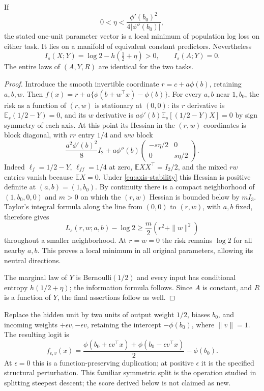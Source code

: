 \begin{proposition}
\label{prop:axis-local-min}
If
\begin{equation}
 0<\eta<\frac{\phi'(b_0)^2}{4|\phi''(b_0)|},
 \label{eq:axis-stability}
\end{equation}
the stated one-unit parameter vector is a local minimum of population
log loss on either task. It lies on a manifold of equivalent constant
predictors. Nevertheless
\[
 I_s(X;Y)=\log2-h(\tfrac12+\eta)>0,
 \qquad I_s(A;Y)=0.
\]
The entire laws of $(A,Y,R)$ are identical for the two tasks.
\end{proposition}
\begin{proof}
Introduce the smooth invertible coordinate $r=c+a\phi(b)$, retaining
$a,b,w$. Then
$f(x)=r+a\{\phi(b+w^\top x)-\phi(b)\}$.
For every $a,b$ near $1,b_0$, the risk as a function of $(r,w)$ is
stationary at $(0,0)$: its $r$ derivative is
$\mathbb E_s(1/2-Y)=0$, and its $w$ derivative is
$a\phi'(b)\mathbb E_s[(1/2-Y)X]=0$ by sign symmetry of each axis.
At this point its Hessian in the $(r,w)$ coordinates is block diagonal,
with $rr$ entry $1/4$ and $ww$ block
\begin{equation}
 \frac{a^2\phi'(b)^2}{8}I_2
 +a\phi''(b)
 \begin{pmatrix}-s\eta/2&0\\0&s\eta/2\end{pmatrix}.
 \label{eq:axis-hessian}
\end{equation}
Indeed $\ell_f=1/2-Y$, $\ell_{ff}=1/4$ at zero,
$\mathbb E XX^\top=I_2/2$, and the mixed $rw$ entries vanish because
$\mathbb EX=0$. Under \eqref{eq:axis-stability} this Hessian is
positive definite at $(a,b)=(1,b_0)$. By continuity there is a compact
neighborhood of $(1,b_0,0,0)$ and $m>0$ on which the $(r,w)$ Hessian is
bounded below by $mI_3$. Taylor's integral formula along the line from
$(0,0)$ to $(r,w)$, with $a,b$ fixed, therefore gives
\[
 L_s(r,w;a,b)-\log2\ge \frac m2(r^2+\|w\|^2)
\]
throughout a smaller neighborhood. At $r=w=0$ the risk remains $\log2$
for all nearby $a,b$. This proves a local minimum in all original
parameters, allowing its neutral directions.

The marginal law of $Y$ is Bernoulli$(1/2)$ and every input has
conditional entropy $h(1/2+\eta)$; the information formula follows.
Since $A$ is constant, and $R$ is a function of $Y$, the final assertions
follow as well.
\end{proof}

Replace the hidden unit by two units of output weight $1/2$, biases
$b_0$, and incoming weights $+\epsilon v,-\epsilon v$, retaining the
intercept $-\phi(b_0)$, where $\|v\|=1$. The resulting logit is
\begin{equation}
 f_{\epsilon,v}(x)=\frac{\phi(b_0+\epsilon v^\top x)
 +\phi(b_0-\epsilon v^\top x)}2-\phi(b_0).
 \label{eq:axis-split}
\end{equation}
At $\epsilon=0$ this is a function-preserving duplication; at positive
$\epsilon$ it is the specified structural perturbation. This familiar
symmetric split is the operation studied in splitting steepest descent;
the score derived below is not claimed as new.

